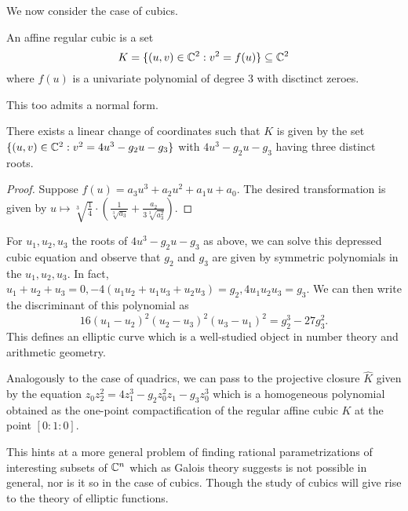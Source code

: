 We now consider the case of cubics. 
\begin{definition}\label{def: affine regular cubic}
    An affine regular cubic is a set 
    $$K=\{(u,v)\in\mathbb{C}^{2}:v^{2}=f(u)\}\subseteq\mathbb{C}^{2}$$
    where $f(u)$ is a univariate polynomial of degree 3 with disctinct zeroes. 
\end{definition}
This too admits a normal form. 
\begin{proposition}\label{prop: existence of normal form for cubics}
    There exists a linear change of coordinates such that $K$ is given by the set $\{(u,v)\in\mathbb{C}^{2}:v^{2}=4u^{3}-g_{2}u-g_{3}\}$ with $4u^{3}-g_{2}u-g_{3}$ having three distinct roots.
\end{proposition}
\begin{proof}
    Suppose $f(u)=a_{3}u^{3}+a_{2}u^{2}+a_{1}u+a_{0}$. The desired transformation is given by $u\mapsto \sqrt[3]{\frac{1}{4}}\cdot\left(\frac{1}{\sqrt[3]{a_{3}}}+\frac{a_{2}}{3\sqrt[3]{a_{3}^{2}}}\right)$.
\end{proof}
For $u_{1},u_{2},u_{3}$ the roots of $4u^{3}-g_{2}u-g_{3}$ as above, we can solve this depressed cubic equation and observe that $g_{2}$ and $g_{3}$ are given by symmetric polynomials in the $u_{1},u_{2},u_{3}$. In fact, $u_{1}+u_{2}+u_{3}=0, -4(u_{1}u_{2}+u_{1}u_{3}+u_{2}u_{3})=g_{2}, 4u_{1}u_{2}u_{3}=g_{3}$. We can then write the discriminant of this polynomial as 
$$16(u_{1}-u_{2})^{2}(u_{2}-u_{3})^{2}(u_{3}-u_{1})^{2}=g_{2}^{3}-27g_{3}^{2}.$$
This defines an elliptic curve which is a well-studied object in number theory and arithmetic geometry. 

Analogously to the case of quadrics, we can pass to the projective closure $\widehat{K}$ given by the equation $z_{0}z_{2}^{2}=4z_{1}^{3}-g_{2}z_{0}^{2}z_{1}-g_{3}z_{0}^{3}$ which is a homogeneous polynomial obtained as the one-point compactification of the regular affine cubic $K$ at the point $[0:1:0]$.

This hints at a more general problem of finding rational parametrizations of interesting subsets of $\mathbb{C}^{n}$ which as Galois theory suggests is not possible in general, nor is it so in the case of cubics. Though the study of cubics will give rise to the theory of elliptic functions. 

